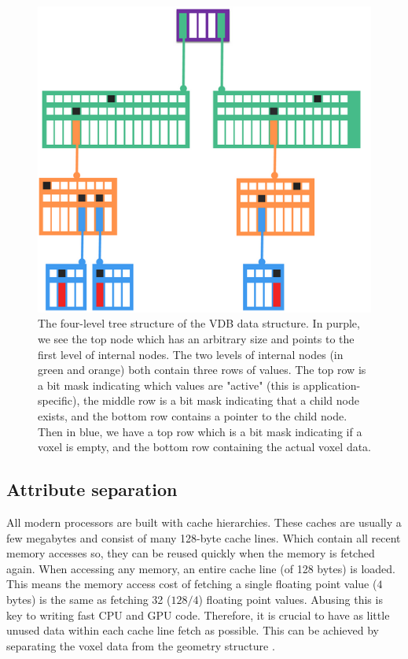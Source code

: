 \begin{figure}
    \centering
    \includegraphics[width=\linewidth]{figures/OpenVDB.png}
    \caption{The four-level tree structure of the VDB data structure. In purple, we see the top node which has an arbitrary size and points to the first level of internal nodes. The two levels of internal nodes (in green and orange) both contain three rows of values. The top row is a bit mask indicating which values are "active" (this is application-specific), the middle row is a bit mask indicating that a child node exists, and the bottom row contains a pointer to the child node. Then in blue, we have a top row which is a bit mask indicating if a voxel is empty, and the bottom row containing the actual voxel data. \cite{museth2013vdb}}
    \label{fig:VDB}
\end{figure}




\subsection{Attribute separation} \label{related_work:attribute_separation}
All modern processors are built with cache hierarchies. These caches are usually a few megabytes and consist of many 128-byte cache lines. Which contain all recent memory accesses so, they can be reused quickly when the memory is fetched again. When accessing any memory, an entire cache line (of 128 bytes) is loaded. This means the memory access cost of fetching a single floating point value ($4$ bytes) is the same as fetching 32 ($128/4$) floating point values. Abusing this is key to writing fast CPU and GPU code. Therefore, it is crucial to have as little unused data within each cache line fetch as possible. This can be achieved by separating the voxel data from the geometry structure \cite{dado2016geometry}.
